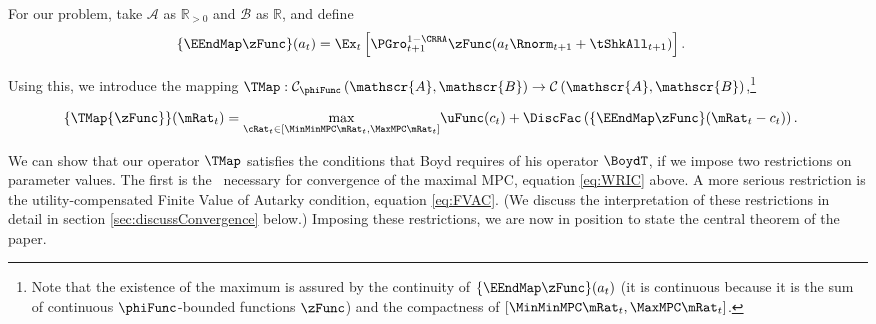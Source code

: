 \documentclass[BufferStockTheory]{subfiles}
\begin{document}
For our problem, take $\mathscr{A}$ as $\mathbb{R}_{>0}$ and $\mathscr{B}$
as $\mathbb{R}$, and define
\begin{align*}
  \{\EEndMap \zFunc\}(a_{t})  & = \Ex_{t}\left[\PGro^{1-\CRRA}_{t+1} \zFunc(a_{t} \Rnorm_{t+1} + \tShkAll_{t+1})\right].
\end{align*}

Using this, we introduce the mapping \textit{$\TMap:\mathcal{C}_{\phiFunc }\left( \mathscr{A},\mathscr{B}\right) \rightarrow \mathcal{C}\left(
    \mathscr{A},\mathscr{B}\right) $},\footnote{Note that the existence of the maximum is assured by the continuity of $\{\EEndMap \zFunc\}(a_{t})$ (it is continuous because it is the sum of continuous $\phiFunc$-bounded functions $\zFunc$) and the compactness of $[\MinMinMPC \mRat_{t},  \MaxMPC \mRat_{t}]$.}

\begin{align}
  \{\TMap{\zFunc}\}(\mRat_{t})  & = \underset{{\cRat}_{t} \in
                                  [\MinMinMPC \mRat_{t}, \MaxMPC \mRat_{t}]
                                  } \max
                                  \uFunc(c_{t})+\DiscFac \left( \{\EEndMap \zFunc \}(\mRat_{t}-c_{t}) \right)  \label{definitionmappingT}.
\end{align}

\hypertarget{Contraction-Conditions}{}

We can show that our operator $\TMap$ satisfies the conditions that
Boyd requires of his operator $\BoydT$, if we impose two restrictions
on parameter values.  The first is the \WRIC~necessary for
convergence of the maximal MPC, equation \eqref{eq:WRIC} above.  A
more serious restriction is the utility-compensated Finite Value of
Autarky condition, equation \eqref{eq:FVAC}.  (We discuss the
interpretation of these restrictions in detail in section
\ref{sec:discussConvergence} below.)  Imposing these restrictions, we
are now in position to state the central theorem of the paper.
\end{document}
